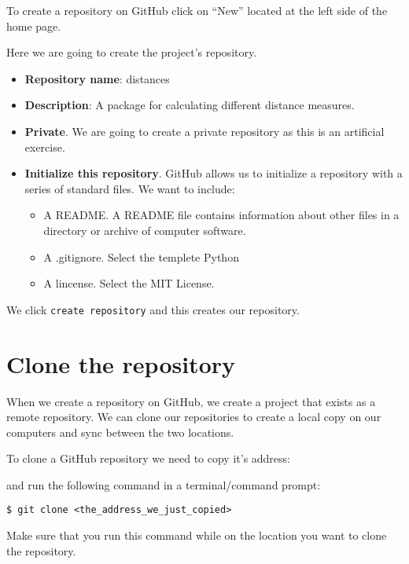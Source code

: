 \documentclass[11pt]{article}
\providecommand{\tightlist}{%
      \setlength{\itemsep}{0pt}\setlength{\parskip}{0pt}}
\begin{document}
To create a repository on GitHub click on ``New'' located at the left
side of the home page.

    Here we are going to create the project's repository.

\begin{itemize}
\tightlist
\item
  \textbf{Repository name}: distances
\item
  \textbf{Description}: A package for calculating different distance
  measures.
\item
  \textbf{Private}. We are going to create a private repository as this
  is an artificial exercise.
\item
  \textbf{Initialize this repository}. GitHub allows us to initialize a
  repository with a series of standard files. We want to include:

  \begin{itemize}
  \tightlist
  \item
    A README. A README file contains information about other files in a
    directory or archive of computer software.
  \item
    A .gitignore. Select the templete Python
  \item
    A lincense. Select the MIT License.
  \end{itemize}
\end{itemize}

    

    We click \texttt{create\ repository} and this creates our repository.

    \hypertarget{clone-the-repository}{%
\section{Clone the repository}\label{clone-the-repository}}

When we create a repository on GitHub, we create a project that exists
as a remote repository. We can clone our repositories to create a local
copy on our computers and sync between the two locations.

To clone a GitHub repository we need to copy it's address:

and run the following command in a terminal/command prompt:

\begin{verbatim}
$ git clone <the_address_we_just_copied>
\end{verbatim}

Make sure that you run this command while on the location you want to
clone the repository.
\end{document}
